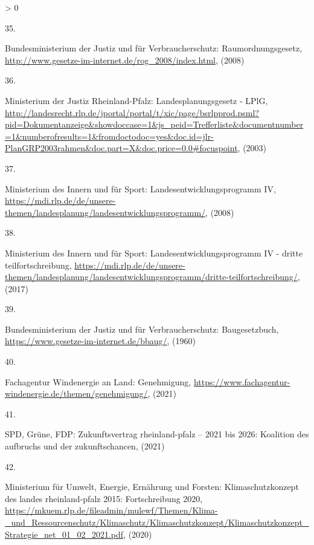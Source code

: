 \documentclass[a4paper,11pt]{article}
\newlength{\cslhangindent}
\newlength{\csllabelwidth}
\newenvironment{CSLReferences}[3] %
 {%
  \setlength{\parindent}{0pt}
  \ifodd #1 \everypar{\setlength{\hangindent}{\cslhangindent}}\ignorespaces\fi
  \ifnum #2 > 0
  \setlength{\parskip}{#2\baselineskip}
  \fi
 }%
 {}
\newcommand{\CSLLeftMargin}[1]{\parbox[t]{\maxof{\widthof{#1}}{\csllabelwidth}}{#1}}
\newcommand{\CSLRightInline}[1]{\parbox[t]{\linewidth}{#1}}
\begin{document}
\begin{CSLReferences}{0}{0}
\leavevmode\hypertarget{ref-BundesministeriumderJustizundfurVerbraucherschutz.2008}{}%
\CSLLeftMargin{35. }
\CSLRightInline{Bundesministerium der Justiz und für Verbraucherschutz: Raumordnungsgesetz, \url{http://www.gesetze-im-internet.de/rog_2008/index.html}, (2008)}

\leavevmode\hypertarget{ref-MinisteriumderJustizRheinlandPfalz.2003}{}%
\CSLLeftMargin{36. }
\CSLRightInline{Ministerium der Justiz Rheinland-Pfalz: Landesplanungsgesetz - LPlG, \url{http://landesrecht.rlp.de/jportal/portal/t/xic/page/bsrlpprod.psml?pid=Dokumentanzeige\&showdoccase=1\&js_peid=Trefferliste\&documentnumber=1\&numberofresults=1\&fromdoctodoc=yes\&doc.id=jlr-PlanGRP2003rahmen\&doc.part=X\&doc.price=0.0\#focuspoint}, (2003)}

\leavevmode\hypertarget{ref-MinisteriumdesInnernundfurSport.2008}{}%
\CSLLeftMargin{37. }
\CSLRightInline{Ministerium des Innern und für Sport: Landesentwicklungsprogramm IV, \url{https://mdi.rlp.de/de/unsere-themen/landesplanung/landesentwicklungsprogramm/}, (2008)}

\leavevmode\hypertarget{ref-MinisteriumdesInnernundfurSport.2017}{}%
\CSLLeftMargin{38. }
\CSLRightInline{Ministerium des Innern und für Sport: Landesentwicklungsprogramm IV - dritte teilfortschreibung, \url{https://mdi.rlp.de/de/unsere-themen/landesplanung/landesentwicklungsprogramm/dritte-teilfortschreibung/}, (2017)}

\leavevmode\hypertarget{ref-BundesministeriumderJustizundfurVerbraucherschutz.1960}{}%
\CSLLeftMargin{39. }
\CSLRightInline{Bundesministerium der Justiz und für Verbraucherschutz: Baugesetzbuch, \url{https://www.gesetze-im-internet.de/bbaug/}, (1960)}

\leavevmode\hypertarget{ref-FachagenturWindenergieanLand.2021}{}%
\CSLLeftMargin{40. }
\CSLRightInline{Fachagentur Windenergie an Land: Genehmigung, \url{https://www.fachagentur-windenergie.de/themen/genehmigung/}, (2021)}

\leavevmode\hypertarget{ref-SPD.2021}{}%
\CSLLeftMargin{41. }
\CSLRightInline{SPD, Grüne, FDP: Zukunftsvertrag rheinland-pfalz -- 2021 bis 2026: Koalition des aufbruchs und der zukunftschancen, (2021)}

\leavevmode\hypertarget{ref-MinisteriumfurUmweltEnergieErnahrungundForsten.2020b}{}%
\CSLLeftMargin{42. }
\CSLRightInline{Ministerium für Umwelt, Energie, Ernährung und Forsten: Klimaschutzkonzept des landes rheinland-pfalz 2015: Fortschreibung 2020, \url{https://mkuem.rlp.de/fileadmin/mulewf/Themen/Klima-_und_Ressourcenschutz/Klimaschutz/Klimaschutzkonzept/Klimaschutzkonzept_Strategie_net_01_02_2021.pdf}, (2020)}


\end{CSLReferences}
\end{document}
